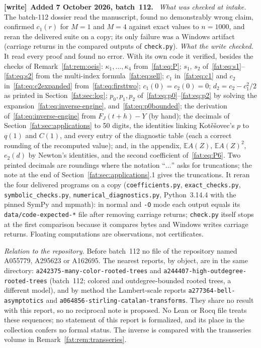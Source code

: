\documentclass[11pt,letterpaper]{article}
\numberwithin{equation}{section}
\newcommand{\file}[1]{\nolinkurl{#1}}
\newenvironment{writenote}[1][]{\par\smallskip\begingroup\small
 \noindent\textbf{[write]}\if\relax\detokenize{#1}\relax\else~\textbf{#1.}\fi\ }%
 {\par\endgroup\smallskip}
\theoremstyle{remark}\newtheorem{remark}[theorem]{Remark}
\newcommand{\E}{\mathbb E}\newcommand{\Prob}{\mathbb P}\newcommand{\ee}{\mathrm e}
\begin{document}
\begin{writenote}[Added 7 October 2026, batch~112]
\emph{What was checked at intake.} The batch-112 dossier read the
manuscript, found no demonstrably wrong claim, confirmed $c_1(r)$ for $M=1$
and $M=4$ against exact values to $n=1000$, and reran the delivered suite on
a copy; its only failure was a Windows artifact (carriage returns in the
compared outputs of \file{check.py}). \emph{What the write checked.} It read
every proof and found no error. With its own code it verified, besides the
checks of Remark~\ref{fat:rem:oeis}: $\kappa_1,\ldots,\kappa_4$
from~\eqref{fat:eq:P}; $s_1$, $s_2$ of~\eqref{fat:eq:s1}--\eqref{fat:eq:s2}
from the multi-index formula~\eqref{fat:eq:sell}; $c_1$ in~\eqref{fat:eq:c1}
and $c_2$ in~\eqref{fat:eq:c2expanded} from~\eqref{fat:eq:firsttwo};
$c_1(0)=c_2(0)=0$; $d_2=c_2-c_1^2/2$ as printed in Section~\ref{fat:sec:log};
$p_0,p_1,p_2$ of~\eqref{fat:eq:p0}--\eqref{fat:eq:p2} by solving the
expansion~\eqref{fat:eq:inverse-engine}, and~\eqref{fat:eq:p0bounded}; the
derivation of~\eqref{fat:eq:inverse-engine} from $F_J(t+h)-Y$ (by hand); the
decimals of Section~\ref{fat:sec:applications} to 50 digits, the
identities linking Kot\v{e}\v{s}ovec's $p$ to $q(1)$ and $C(1)$, and every
entry of the diagnostic table (each a correct rounding of the recomputed
value); and, in the appendix, $\E A(Z)$, $\E A(Z)^2$, $e_2(d)$ by Newton's
identities, and the second coefficient of~\eqref{fat:eq:P6}. Two printed
decimals are roundings where the notation ``$\ldots$'' asks for truncations;
the note at the end of Section~\ref{fat:sec:applications}.1 gives the
truncations. It reran the four delivered programs on a copy (\file{coefficients.py}, \file{exact_checks.py}, \file{symbolic_checks.py}, \file{numerical_diagnostics.py}, Python~3.14.4 with the pinned SymPy and mpmath): in normal and \texttt{-O} mode each output equals its \file{data/code-expected-*} file after removing carriage returns; \file{check.py} itself stops at the first comparison because it compares bytes and Windows writes carriage returns.
Floating computations are observations, not certificates.

\emph{Relation to the repository.} Before batch~112 no file of the
repository named A055779, A295623 or A162695. The nearest reports, by
object, are in the same directory: \file{a242375-many-color-rooted-trees}
and \file{a244407-high-outdegree-rooted-trees} (batch~112; colored and
outdegree-bounded rooted trees, a different model), and by method the
Lambert-scale reports \file{a277364-bell-asymptotics} and
\file{a064856-stirling-catalan-transforms}. They share no result with this
report, so no reciprocal note is proposed. No Lean or Rocq file treats these
sequences; no statement of this report is formalized, and its place in the
collection confers no formal status. The inverse is compared with the
transseries volume in Remark~\ref{fat:rem:transseries}.
\end{writenote}
\end{document}
